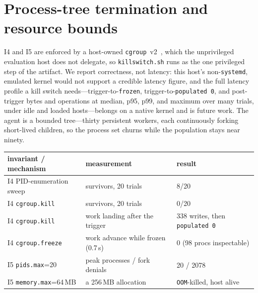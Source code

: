 \documentclass[11pt]{article}
\begin{document}
\section{Process-tree termination and resource bounds}\label{sec:killswitch}

I4 and I5 are enforced by a host-owned \texttt{cgroup}~v2~\cite{cgroup2}, which the unprivileged evaluation
host does not delegate, so \texttt{killswitch.sh} runs as the one privileged step of the artifact. We
report correctness, not latency: this host's non-\texttt{systemd}, emulated kernel would not support a
credible latency figure, and the full latency profile a kill switch needs---trigger-to-\texttt{frozen},
trigger-to-\texttt{populated~0}, and post-trigger bytes and operations at median, p95, p99, and maximum
over many trials, under idle and loaded hosts---belongs on a native kernel and is future work. The agent
is a bounded tree---thirty persistent workers, each continuously forking short-lived children, so the
process set churns while the population stays near ninety.

\begin{center}
\begin{tabular}{lll}
\toprule
invariant / mechanism & measurement & result \\
\midrule
I4 PID-enumeration sweep & survivors, 20 trials & 8/20 \\
I4 \texttt{cgroup.kill} & survivors, 20 trials & 0/20 \\
I4 \texttt{cgroup.kill} & work landing after the trigger & 338 writes, then \texttt{populated 0} \\
I4 \texttt{cgroup.freeze} & work advance while frozen (0.7\,s) & 0 (98 procs inspectable) \\
I5 \texttt{pids.max}=20 & peak processes / fork denials & 20 / 2078 \\
I5 \texttt{memory.max}=64\,MB & a 256\,MB allocation & \texttt{OOM}-killed, host alive \\
\bottomrule
\end{tabular}
\end{center}
\end{document}
